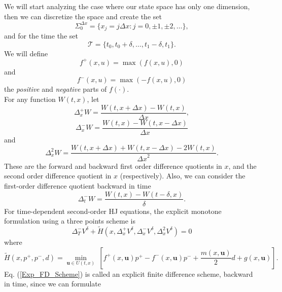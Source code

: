 We will start analyzing the case where our state space has only one dimension, then we can 
discretize the space and create the set
\begin{equation}
\Sigma^{\Delta x}_0=\{x_j=j\Delta x:j=0,\pm1,\pm2,\dots\},
\label{Infinite_Lattice}
\end{equation}
and for the time the set
\begin{equation}
\mathcal{T}=\{t_0,t_0+\delta,\dots,t_1-\delta,t_1\}.
\label{Time_Lattice}
\end{equation}
We will define
\begin{equation}
f^+(x,u)=\max(f(x,u),0)
\end{equation}
and
\begin{equation}
f^-(x,u)=\max(-f(x,u),0)
\end{equation}
the \textit{positive} and \textit{negative} parts of $f(\cdot)$.\\
For any function $W(t,x)$, let
\begin{equation}
\Delta_{x}^+W=\frac{W(t,x+\Delta x)-W(t,x)}{\Delta x},
\end{equation}
\begin{equation}
\Delta_{x}^-W=\frac{W(t,x)-W(t,x-\Delta x)}{\Delta x}
\end{equation}
and
\begin{equation}
\Delta^2_xW=\frac{W(t,x+\Delta x)+W(t,x-\Delta x)-2W(t,x)}{{\Delta x}^2}.
\end{equation}
These are the forward and backward first order difference quotients in $x$, and the 
second order difference quotient in $x$ (respectively). Also, we can consider the 
first-order difference quotient backward in time
\begin{equation}
\Delta^-_tW=\frac{W(t,x)-W(t-\delta,x)}{\delta}.
\end{equation}
For time-dependent second-order HJ equations, the explicit monotone formulation using a three 
points scheme is
\begin{equation}
\Delta_T^-V^{\delta}+\tilde{H}(x,\Delta^+_{x}V^{\delta},\Delta^-_{x}V^{\delta},\Delta^2_{x}V^{\delta})=0
\label{Exp_FD_Scheme}
\end{equation}
 where
 \begin{equation}
 \tilde{H}(x,p^+,p^-,d)=\min_{\bm{u}\in U(t,x)}\ \left[f^+(x,\bm{u})p^+-f^-(x,\bm{u})p^-+\frac{m(x,\bm{u})}{2}d+g(x,\bm{u})\right].
 \end{equation}
 Eq. (\ref{Exp_FD_Scheme}) is called an explicit finite difference scheme, backward in time, since we can formulate
